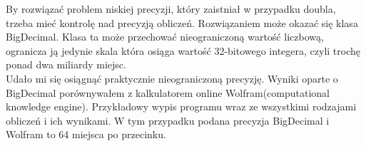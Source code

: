 \documentclass[10pt]{article}
\begin{document}
By rozwiązać problem niskiej precyzji, który zaistniał w przypadku doubla, trzeba mieć kontrolę nad precyzją obliczeń. Rozwiązaniem może okazać się klasa BigDecimal. Klasa ta może przechować nieograniczoną 
wartość liczbową, ogranicza ją jedynie skala która osiąga wartość 32-bitowego integera, czyli trochę 
ponad dwa miliardy miejsc. \\
Udało mi się osiągnąć praktycznie nieograniczoną precyzję. Wyniki oparte o BigDecimal porównywałem z kalkulatorem online Wolfram(computational knowledge engine). Przykładowy wypis programu wraz ze wszystkimi rodzajami obliczeń i ich wynikami. W tym przypadku podana precyzja BigDecimal i Wolfram to 64 miejsca po przecinku.

\begin{center}
\end{center}
\end{document}

